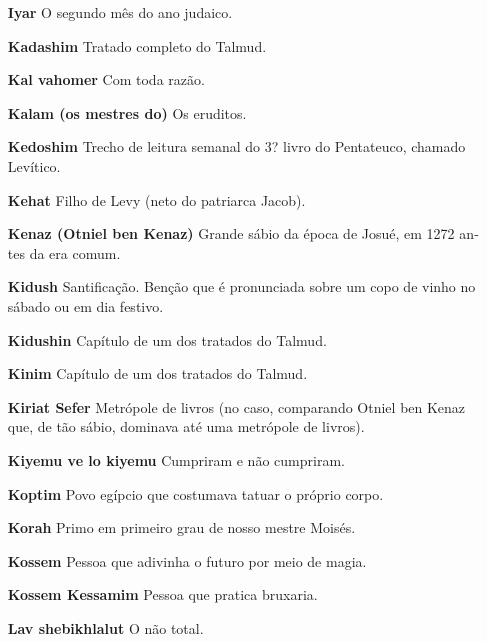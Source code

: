 \begin{itemize}
\item[\textbf{Iyar}] O segundo mês do ano judaico.

\item[\textbf{Kadashim}] Tratado completo do Tal­mud.

\item[\textbf{Kal vahomer}] Com toda razão.

\item[\textbf{Kalam (os mestres do)}] Os eruditos.

\item[\textbf{Kedoshim}] Trecho de leitura sema­nal do 3? livro
do Pentateuco, chama­do Levítico.

\item[\textbf{Kehat}] Filho de Levy (neto do patriar­ca Jacob).

\item[\textbf{Kenaz (Otniel ben Kenaz)}] Grande sábio da época de Josué, em
1272 an­tes da era comum.

\item[\textbf{Kidush}] Santificação. Benção que é pronunciada sobre um copo
de vinho no sábado ou em dia festivo.

\item[\textbf{Kidushin}] Capítulo de um dos trata­dos do Talmud.

\item[\textbf{Kinim}] Capítulo de um dos tratados do Talmud.

\item[\textbf{Kiriat Sefer}] Metrópole de livros (no caso, comparando Otniel
ben Kenaz que, de tão sábio, dominava até uma metrópole de livros).

\item[\textbf{Kiyemu ve lo kiyemu}] Cumpriram e não cumpriram.

\item[\textbf{Koptim}] Povo egípcio que costuma­va tatuar o próprio corpo.

\item[\textbf{Korah}] Primo em primeiro grau de nosso mestre Moisés.

\item[\textbf{Kossem}] Pessoa que adivinha o futu­ro por meio de magia.

\item[\textbf{Kossem Kessamim}] Pessoa que pra­tica bruxaria.

\item[\textbf{Lav shebikhlalut}] O não total.


\end{itemize}
